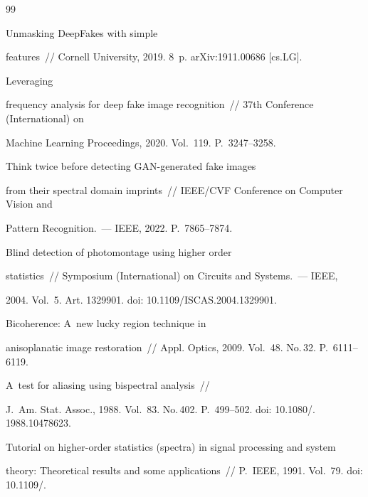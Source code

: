{{\begin{thebibliography}{99}


   Unmasking DeepFakes with simple 


features~/\!\!/ Cornell University, 2019. 8~p. arXiv:1911.00686 [cs.LG].




   Leveraging 


frequency analysis for deep fake image recognition~/\!\!/ 37th  Conference (International) on 


Machine Learning Proceedings, 2020. Vol.~119. P.~3247--3258.




   Think twice before detecting GAN-generated fake images 


from their spectral domain imprints~/\!\!/ IEEE\!/\!CVF Conference on Computer Vision and 


Pattern Recognition.~--- IEEE, 2022. P.~7865--7874.




   Blind detection of photomontage using higher order 


statistics~/\!\!/ Symposium (International) on Circuits and Systems.~--- IEEE, 


2004. Vol.~5. Art. 1329901. doi: 10.1109\!/\!ISCAS.2004.1329901.




   Bicoherence: A~new lucky region technique in 


anisoplanatic image restoration~/\!\!/ Appl. Optics, 2009. Vol.~48. No.\,32. P.~6111--6119.




   A~test for aliasing using bispectral analysis~/\!\!/ 


  J.~Am. Stat. Assoc., 1988. Vol.~83. No.\,402. P.~499--502.  doi: 10.1080\!/. 1988.10478623.




   Tutorial on higher-order statistics (spectra) in signal processing and system 


theory: Theoretical results and some applications~/\!\!/ P.~IEEE, 1991. Vol.~79.  doi: 10.1109\!/.



\end{thebibliography}}}
